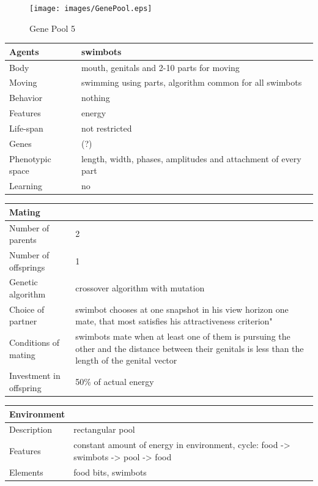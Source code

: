 \documentclass[a4paper,12pt]{report}
\begin{document}
\begin{figure}
\begin{center}
  \texttt{[image: images/GenePool.eps]}
  \caption{Gene Pool 5}
  \label{img.GenePool}
\end{center}
\end{figure}
  
\vspace{20pt}
\begin{tabular}{|p{150pt}|p{220pt}|}
\hline
\textbf{Agents}&swimbots\\ \hline
Body&mouth, genitals and 2-10 parts for moving\\ \hline
Moving&swimming using parts, algorithm common for all swimbots\\ \hline
Behavior&nothing\\ \hline
Features&energy\\ \hline
Life-span&not restricted\\ \hline
Genes&(?)\\ \hline
Phenotypic space&length, width, phases, amplitudes and attachment of every part\\ \hline
Learning&no\\ \hline
\end{tabular} 

\vspace{10pt}
\begin{tabular}{|p{150pt}|p{220pt}|} \hline \textbf{Mating}&\\ \hline
Number of parents&2\\ \hline
Number of offsprings&1\\ \hline
Genetic algorithm&crossover algorithm with mutation\\ \hline
Choice of partner&swimbot chooses at one snapshot in his view horizon one mate, that most satisfies his attractiveness criterion"\\ \hline
Conditions of mating&swimbots mate when at least one of them is pursuing the other and the distance between their genitals is less than the length of the genital vector\\ \hline
Investment in offspring&50\% of actual energy\\ \hline
\end{tabular} 

\vspace{10pt}
\begin{tabular}{|p{150pt}|p{220pt}|} \hline \textbf{Environment}&\\ \hline
Description&rectangular pool\\ \hline
Features&constant amount of energy in environment, cycle: food -> swimbots -> pool -> food\\ \hline
Elements&food bits, swimbots\\ \hline
\end{tabular} 
\end{document}
